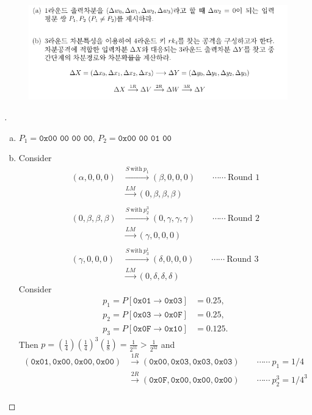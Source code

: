 \begin{enumerate}[\bf 1.]
\begin{figure}[h!]
		\includegraphics[scale=.6]{final2023-4-2}
	\end{figure}
	\newpage
	\begin{proof}[\sol]
		\ \begin{enumerate}[(a)]
			\item $P_1=\texttt{0x00\ 00\ 00\ 00}$, $P_2=\texttt{0x00\ 00\ 01\ 00}$
			\item Consider \begin{align*}
				(\alpha, 0, 0, 0)&\xrightarrow{S\ \text{with}\ p_1}(\beta,0,0,0)\quad\quad\cdots\cdots\ \text{Round 1}\\
				&\xrightarrow{LM}(0,\beta,\beta,\beta) \\ \\
				(0,\beta,\beta,\beta)&\xrightarrow{S\ \text{with}\ p_2^3}(0,\gamma,\gamma,\gamma)\quad\quad\cdots\cdots\ \text{Round 2}\\
				&\xrightarrow{LM}(\gamma,0,0,0)\\ \\
				(\gamma,0,0,0)&\xrightarrow{S\ \text{with}\ p_3^1}(\delta,0,0,0)\quad\quad\cdots\cdots\ \text{Round 3}\\
				&\xrightarrow{LM}(0,\delta,\delta,\delta)
			\end{align*} Consider \begin{align*}
				p_1=P[\texttt{0x01}\to\texttt{0x03}]&=0.25,\\
				p_2=P[\texttt{0x03}\to\texttt{0x0F}]&=0.25,\\
				p_3=P[\texttt{0x0F}\to\texttt{0x10}]&=0.125.
		\end{align*} Then $p=\displaystyle\left(\frac{1}{4}\right)\left(\frac{1}{4}\right)^3\left(\frac{1}{8}\right)=\frac{1}{2^{11}}>\frac{1}{2^{32}}$ and \begin{align*}
		(\texttt{0x01},\texttt{0x00},\texttt{0x00},\texttt{0x00})&\xrightarrow{1R}(\texttt{0x00},\texttt{0x03},\texttt{0x03},\texttt{0x03})\quad\quad\cdots\cdots\ p_1=1/4\\
		&\xrightarrow{2R}(\texttt{0x0F},\texttt{0x00},\texttt{0x00},\texttt{0x00})\quad\quad\cdots\cdots\ p_2^3=1/4^3\\

\end{align*}
\end{enumerate}
\end{proof}
\end{enumerate}
